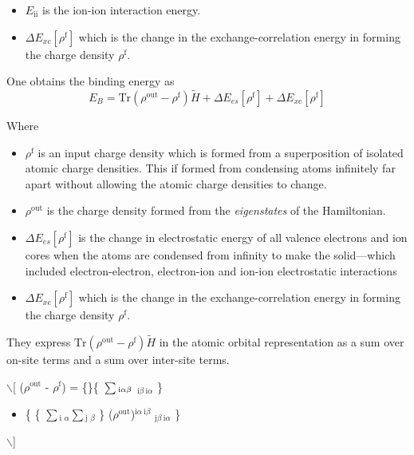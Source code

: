 \documentclass[11pt]{article}
\begin{document}
\begin{enumerate}
\begin{enumerate}
\begin{itemize}
\item $E_{\text{ii}}$ is the ion-ion interaction energy.

\item $\Delta E_{xc}[\rho^{\text{f}}]$  which is the change in the exchange-correlation energy in forming the charge
density $\rho^{\text{f}}$.
\end{itemize}

One obtains the binding energy as 
\[
E_{B} = \text{Tr}( \rho^{\text{out}} - \rho^{\text{f}} )\widetilde{H} + \Delta E_{es}[\rho^{\text{f}}] + \Delta E_{xc}[\rho^{\text{f}}]
\]

Where 
\begin{itemize}
\item $\rho^{\text{f}}$ is an input charge density which is formed
from a superposition of isolated atomic charge densities. This if formed
from condensing atoms infinitely far apart without allowing the atomic
charge densities to change.

\item $\rho^{\text{out}}$ is the charge
density formed from the \emph{eigenstates} of the Hamiltonian.

\item $\Delta E_{es}[\rho^{\text{f}}]$ is the change in electrostatic energy
of all valence electrons and ion cores when the atoms are condensed from
infinity to make the solid---which included electron-electron, electron-ion
and ion-ion electrostatic interactions

\item $\Delta E_{xc}[\rho^{\text{f}}]$  which is the change in the exchange-correlation energy in forming the charge
density $\rho^{\text{f}}$.
\end{itemize}

They express $\text{Tr}(\rho^{\text{out}} - \rho^{\text{f}})\widetilde{H}$ in the atomic
orbital representation as a sum over on-site terms and a sum over inter-site
terms. 

$\backslash$[
($\rho$$^{\text{out}}$ - $\rho$$^{\text{f}}$) =
   \underset\{\}\{ 
      $\sum$$_{\text{i\\ }\alpha\beta}$ 
         $_{\text{i}\beta\ \text{i}\alpha}$ 
            \}
\begin{itemize}
\item {}\{
\{ $\sum$$_{\text{i }\alpha}$$\sum$$_{\text{j }\beta}$ \}
   ($\rho$$^{\text{out}}$)$^{\text{i}\alpha\ \text{i}\beta}$ $_{\text{j}\beta\ \text{i}\alpha}$
          \}
\end{itemize}
$\backslash$]


\end{enumerate}
\end{enumerate}
\end{document}
